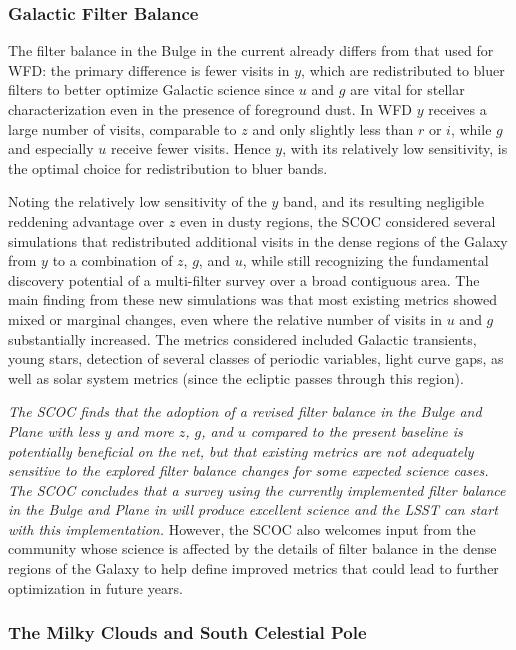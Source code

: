 \subsubsection{Galactic Filter Balance}\label{sec:subG:filterbalance}

The filter balance in the Bulge in the current  already differs from that used for WFD: the primary difference is fewer visits in $y$, which are redistributed to bluer filters to better optimize Galactic science since $u$ and $g$ are vital for stellar characterization even in the presence of foreground dust. In WFD $y$ receives a large number of visits, comparable to $z$ and only slightly less than $r$ or $i$, while $g$ and especially $u$ receive fewer visits. Hence $y$, with its relatively low sensitivity, is the optimal choice for redistribution to bluer bands.

Noting the relatively low sensitivity of the $y$ band, and its resulting negligible reddening advantage over $z$ even in dusty regions, the SCOC considered several simulations that redistributed additional visits in the dense regions of the Galaxy from $y$ to a combination of $z$, $g$, and $u$, while still recognizing the fundamental discovery potential of a multi-filter survey over a broad contiguous area. The main finding from these new simulations was that most existing metrics showed mixed or marginal changes, even where the relative number of visits in $u$ and $g$ substantially increased. The metrics considered included Galactic transients, young stars, detection of several classes of periodic variables, light curve gaps, as well as solar system metrics (since the ecliptic passes through this region).

{\it The SCOC finds that the adoption of a revised filter balance in the Bulge and Plane with less $y$ and more $z$, $g$, and $u$ compared to the present baseline is potentially beneficial on the net, but that existing metrics are not adequately sensitive to the explored filter balance changes for some expected science cases. The SCOC concludes that a survey using the currently implemented filter balance in the Bulge and Plane in  will produce excellent science and the LSST can start with this implementation.} 
However, the SCOC also welcomes input from the community whose science is affected by the details of filter balance in the dense regions of the Galaxy to help define improved metrics that could lead to further optimization in future years.


\subsubsection{The Milky Clouds and South Celestial Pole}\label{sec:subG:specialregions}

